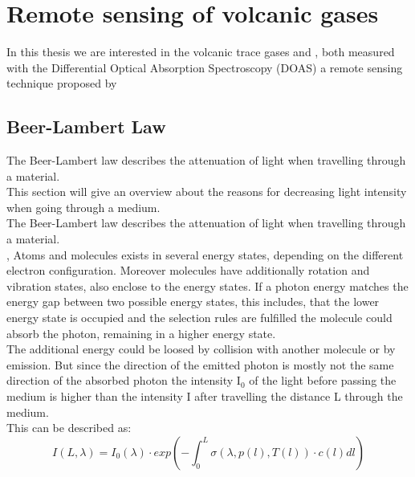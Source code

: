 \documentclass  [
  paper    = a4,
  BCOR     = 10mm,
  twoside,
  fontsize = 12pt,
  fleqn,
  toc      = bibnumbered,
  toc      = listofnumbered,
  numbers  = noendperiod,
  headings = normal,
  listof   = leveldown,
  version  = 3.03
]                                       {scrreprt}
\begin{document}
	\chapter{Remote sensing of volcanic gases}

	In this thesis we are interested in the volcanic trace gases  and , both measured with the Differential Optical Absorption Spectroscopy (DOAS) a remote sensing technique proposed by \cite{platt1980observations}

	

	\section*{Beer-Lambert Law}
	The Beer-Lambert law describes the attenuation of light when travelling through a material.\\
	This section will give an overview about the reasons for decreasing light intensity when going through a medium.\\
	The Beer-Lambert law describes the attenuation of light when travelling through a material.\\
                                                                                                                                                                                                                                                                                       ,
	Atoms and molecules exists in several energy states, depending on the different electron configuration. Moreover molecules have additionally rotation and vibration states, also enclose to the energy states. If a photon energy matches the energy gap between two possible energy states, this includes, that the lower energy state is occupied and the selection rules are fulfilled  the molecule could absorb the photon, remaining in a higher energy state.\\
	The additional energy could be loosed by collision with another molecule or by emission. But since the direction of the emitted photon is mostly not the same direction of the absorbed photon the intensity I$_{0}$ of the light before passing the medium is higher than the intensity I after travelling the distance L through the medium.\\
	This can be described as:\\ 
	\begin{equation}
	I\left(L,\lambda\right) = I_{0}\left(\lambda\right)\cdot exp\left(-\int^{L}_{0}\sigma\left(\lambda,p(l),T(l)\right)\cdot c\left(l\right)dl\right)
	\end{equation}
\end{document}
